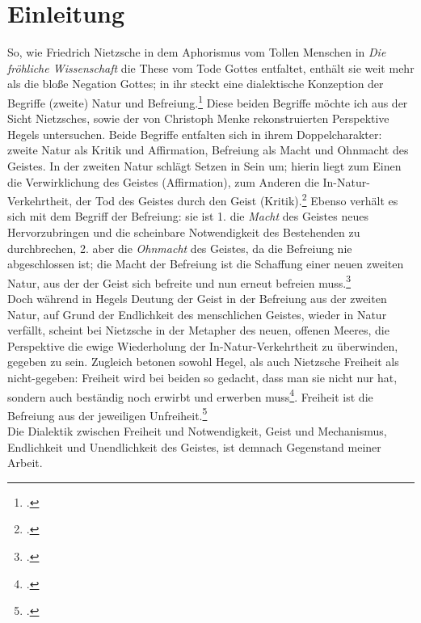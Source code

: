 \documentclass[12pt, a4paper, openany]{report}
\begin{document}
\onehalfspacing
\tableofcontents

\mainmatter

\chapter{Einleitung}
So, wie Friedrich Nietzsche in dem Aphorismus vom \glqq Tollen Menschen\grqq{} in \textit{Die fröhliche Wissenschaft} die These vom Tode Gottes entfaltet, enthält sie weit mehr als die bloße Negation Gottes;
in ihr steckt eine dialektische Konzeption der Begriffe (zweite) Natur und Befreiung.\footcite[Vgl.][481]{nietzsche_morgenrote_1999}
Diese beiden Begriffe möchte ich aus der Sicht Nietzsches, sowie der von Christoph Menke rekonstruierten Perspektive Hegels untersuchen.
Beide Begriffe entfalten sich in ihrem Doppelcharakter: zweite Natur als Kritik und Affirmation, Befreiung als Macht und Ohnmacht des Geistes.
In der zweiten Natur schlägt Setzen in Sein um; hierin liegt zum Einen die Verwirklichung des Geistes (Affirmation), zum Anderen die In-Natur-Verkehrtheit, der Tod des Geistes durch den Geist (Kritik).\footcite[Vgl.][145]{menke_autonomie_2018}
Ebenso verhält es sich mit dem Begriff der Befreiung: 
sie ist 1. die \textit{Macht} des Geistes neues Hervorzubringen und die scheinbare Notwendigkeit des Bestehenden zu durchbrechen, 
2. aber die \textit{Ohnmacht} des Geistes, da die Befreiung nie abgeschlossen ist; die Macht der Befreiung ist die Schaffung einer \glqq neuen\grqq{} zweiten Natur, aus der der Geist sich befreite und nun erneut befreien muss.\footcite[Vgl.][80]{menke_autonomie_2018}\\
Doch während in Hegels Deutung der Geist in der Befreiung aus der zweiten Natur, auf Grund der Endlichkeit des menschlichen Geistes, wieder in Natur verfällt, scheint bei Nietzsche in der Metapher des neuen, offenen Meeres, die Perspektive die ewige Wiederholung der In-Natur-Verkehrtheit zu überwinden, gegeben zu sein.
Zugleich betonen sowohl Hegel, als auch Nietzsche Freiheit als nicht-gegeben: 
Freiheit wird bei beiden so gedacht, dass man sie \glqq nicht nur hat, sondern auch beständig  noch erwirbt und erwerben muss\grqq\footcite[][637]{nietzsche_morgenrote_1999}. 
Freiheit ist die Befreiung aus der jeweiligen Unfreiheit.\footcite[Vgl][227]{adorno_negative_dialektik_2003} \\ 
Die Dialektik zwischen Freiheit und Notwendigkeit, Geist und Mechanismus, Endlichkeit und Unendlichkeit des Geistes, ist demnach Gegenstand meiner Arbeit. 
\end{document}
